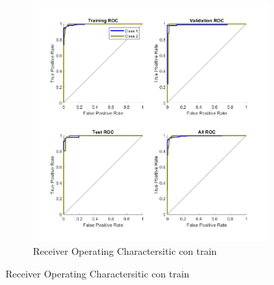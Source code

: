 \documentclass[a4paper, 12pt]{article}
\begin{document}
\begin{figure}[htp!]
\begin{subfigure}{0.49\textwidth}
                        \includegraphics[width=\textwidth]{figures/parte1/Ej4/ej4_roc_train_60.png}
                        \caption{Receiver Operating Charactersitic con train}
                    \end{subfigure}
                \end{figure}

            \newpage
\end{document}

